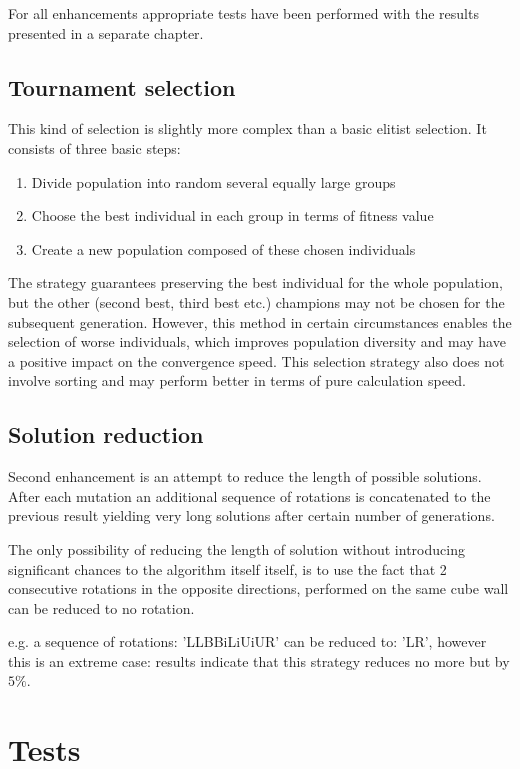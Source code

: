 \documentclass[a4paper]{article}
\begin{document}
For all enhancements appropriate tests have been performed with the results presented in a separate chapter.

\subsection{Tournament selection}
This kind of selection is slightly more complex than a basic elitist selection. It consists of three basic steps:
\begin{enumerate}
\item Divide population into random several equally large groups
\item Choose the best individual in each group in terms of fitness value
\item Create a new population composed of these chosen individuals
\end{enumerate}

The strategy guarantees preserving the best individual for the whole population, but the other (second best, third best etc.) champions may not be chosen for the subsequent generation.
However, this method in certain circumstances enables the selection of worse individuals, which improves population diversity and may have a positive impact on the convergence speed.
This selection strategy also does not involve sorting and may perform better in terms of pure calculation speed.

\subsection{Solution reduction}
Second enhancement is an attempt to reduce the length of possible solutions. After each mutation an additional sequence of rotations is concatenated to the previous result yielding very long solutions after certain number of generations.

The only possibility of reducing the length of solution without introducing significant chances to the algorithm itself itself,
is to use the fact that 2 consecutive rotations in the opposite directions, performed on the same cube wall can be reduced to no rotation.

e.g. a sequence of rotations: 'LLBBiLiUiUR' can be reduced to: 'LR', however this is an extreme case: results indicate that this strategy reduces no more but by $5\%$.

\section{Tests}
\end{document}
